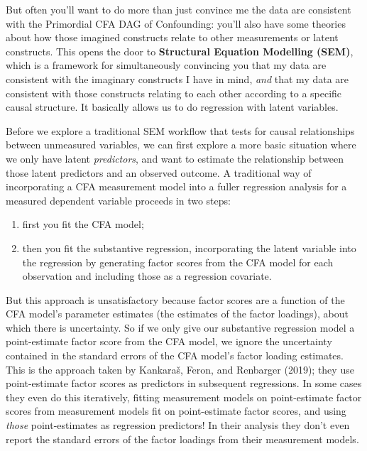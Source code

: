 \documentclass[
  letterpaper,
  DIV=11,
  numbers=noendperiod]{scrreprt}
\providecommand{\tightlist}{%
  \setlength{\itemsep}{0pt}\setlength{\parskip}{0pt}}\usepackage{longtable,booktabs,array}
\begin{document}
But often you'll want to do more than just convince me the data are
consistent with the Primordial CFA DAG of Confounding: you'll also have
some theories about how those imagined constructs relate to other
measurements or latent constructs. This opens the door to
\textbf{Structural Equation Modelling (SEM)}, which is a framework for
simultaneously convincing you that my data are consistent with the
imaginary constructs I have in mind, \emph{and} that my data are
consistent with those constructs relating to each other according to a
specific causal structure. It basically allows us to do regression with
latent variables.

Before we explore a traditional SEM workflow that tests for causal
relationships between unmeasured variables, we can first explore a more
basic situation where we only have latent \emph{predictors}, and want to
estimate the relationship between those latent predictors and an
observed outcome. A traditional way of incorporating a CFA measurement
model into a fuller regression analysis for a measured dependent
variable proceeds in two steps:

\begin{enumerate}
\def\labelenumi{\arabic{enumi}.}
\tightlist
\item
  first you fit the CFA model;
\item
  then you fit the substantive regression, incorporating the latent
  variable into the regression by generating factor scores from the CFA
  model for each observation and including those as a regression
  covariate.
\end{enumerate}

But this approach is unsatisfactory because factor scores are a function
of the CFA model's parameter estimates (the estimates of the factor
loadings), about which there is uncertainty. So if we only give our
substantive regression model a point-estimate factor score from the CFA
model, we ignore the uncertainty contained in the standard errors of the
CFA model's factor loading estimates. This is the approach taken by
Kankaraš, Feron, and Renbarger (2019); they use point-estimate factor
scores as predictors in subsequent regressions. In some cases they even
do this iteratively, fitting measurement models on point-estimate factor
scores from measurement models fit on point-estimate factor scores, and
using \emph{those} point-estimates as regression predictors! In their
analysis they don't even report the standard errors of the factor
loadings from their measurement models.
\end{document}
